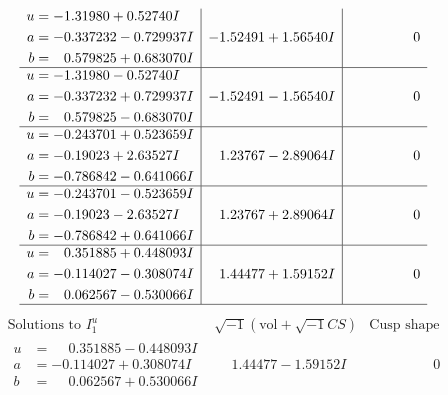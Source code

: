 \documentclass[1p]{elsarticle_modified}
\theoremstyle{definition}
\newcommand{\I}{\sqrt{-1}}
\begin{document}
$$\begin{array}{c|c|c}
\begin{aligned}
u &= -1.31980 + 0.52740 I \\
a &= -0.337232 - 0.729937 I \\
b &= \phantom{-}0.579825 + 0.683070 I\end{aligned}
 & -1.52491 + 1.56540 I & \phantom{-0.000000 } 0 \\ \hline\begin{aligned}
u &= -1.31980 - 0.52740 I \\
a &= -0.337232 + 0.729937 I \\
b &= \phantom{-}0.579825 - 0.683070 I\end{aligned}
 & -1.52491 - 1.56540 I & \phantom{-0.000000 } 0 \\ \hline\begin{aligned}
u &= -0.243701 + 0.523659 I \\
a &= -0.19023 + 2.63527 I \\
b &= -0.786842 - 0.641066 I\end{aligned}
 & \phantom{-}1.23767 - 2.89064 I & \phantom{-0.000000 } 0 \\ \hline\begin{aligned}
u &= -0.243701 - 0.523659 I \\
a &= -0.19023 - 2.63527 I \\
b &= -0.786842 + 0.641066 I\end{aligned}
 & \phantom{-}1.23767 + 2.89064 I & \phantom{-0.000000 } 0 \\ \hline\begin{aligned}
u &= \phantom{-}0.351885 + 0.448093 I \\
a &= -0.114027 - 0.308074 I \\
b &= \phantom{-}0.062567 - 0.530066 I\end{aligned}
 & \phantom{-}1.44477 + 1.59152 I & \phantom{-0.000000 } 0\\
 \hline 
 \end{array}$$\newpage$$\begin{array}{c|c|c}  
\text{Solutions to }I^u_{1}& \I (\text{vol} + \sqrt{-1}CS) & \text{Cusp shape}\\
 \hline 
\begin{aligned}
u &= \phantom{-}0.351885 - 0.448093 I \\
a &= -0.114027 + 0.308074 I \\
b &= \phantom{-}0.062567 + 0.530066 I\end{aligned}
 & \phantom{-}1.44477 - 1.59152 I & \phantom{-0.000000 } 0 \\ \hline\begin{aligned}

\end{aligned}
\end{array}$$
\end{document}

